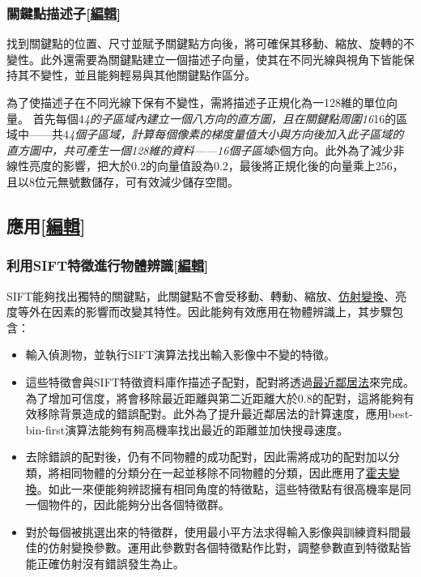 \documentclass[
]{article}
\begin{document}
\hypertarget{header-n65}{%
\subsubsection{\texorpdfstring{關鍵點描述子{[}\href{https://zh.wikipedia.org/w/index.php?title=尺度不變特徵轉換\&action=edit\&section=9}{編輯}{]}}{關鍵點描述子{[}編輯{]}}}\label{header-n65}}

找到關鍵點的位置、尺寸並賦予關鍵點方向後，將可確保其移動、縮放、旋轉的不變性。此外還需要為關鍵點建立一個描述子向量，使其在不同光線與視角下皆能保持其不變性，並且能夠輕易與其他關鍵點作區分。

為了使描述子在不同光線下保有不變性，需將描述子正規化為一128維的單位向量。
首先每個4\emph{4的子區域內建立一個八方向的直方圖，且在關鍵點周圍16}16的區域中------共4\emph{4個子區域，計算每個像素的梯度量值大小與方向後加入此子區域的直方圖中，共可產生一個128維的資料------16個子區域}8個方向。此外為了減少非線性亮度的影響，把大於0.2的向量值設為0.2，最後將正規化後的向量乘上256，且以8位元無號數儲存，可有效減少儲存空間。

\hypertarget{header-n68}{%
\subsection{\texorpdfstring{應用{[}\href{https://zh.wikipedia.org/w/index.php?title=尺度不變特徵轉換\&action=edit\&section=10}{編輯}{]}}{應用{[}編輯{]}}}\label{header-n68}}

\hypertarget{header-n69}{%
\subsubsection{\texorpdfstring{利用SIFT特徵進行物體辨識{[}\href{https://zh.wikipedia.org/w/index.php?title=尺度不變特徵轉換\&action=edit\&section=11}{編輯}{]}}{利用SIFT特徵進行物體辨識{[}編輯{]}}}\label{header-n69}}

SIFT能夠找出獨特的關鍵點，此關鍵點不會受移動、轉動、縮放、\href{https://zh.wikipedia.org/wiki/仿射变换}{仿射變換}、亮度等外在因素的影響而改變其特性。因此能夠有效應用在物體辨識上，其步驟包含：

\begin{itemize}
\item
  輸入偵測物，並執行SIFT演算法找出輸入影像中不變的特徵。
\item
  這些特徵會與SIFT特徵資料庫作描述子配對，配對將透過\href{https://zh.wikipedia.org/wiki/最近鄰居法}{最近鄰居法}來完成。為了增加可信度，將會移除最近距離與第二近距離大於0.8的配對，這將能夠有效移除背景造成的錯誤配對。此外為了提升最近鄰居法的計算速度，應用best-bin-first演算法能夠有夠高機率找出最近的距離並加快搜尋速度。
\item
  去除錯誤的配對後，仍有不同物體的成功配對，因此需將成功的配對加以分類，將相同物體的分類分在一起並移除不同物體的分類，因此應用了\href{https://zh.wikipedia.org/wiki/霍夫變換}{霍夫變換}。如此一來便能夠辨認擁有相同角度的特徵點，這些特徵點有很高機率是同一個物件的，因此能夠分出各個特徵群。
\item
  對於每個被挑選出來的特徵群，使用最小平方法求得輸入影像與訓練資料間最佳的仿射變換參數。運用此參數對各個特徵點作比對，調整參數直到特徵點皆能正確仿射沒有錯誤發生為止。
\end{itemize}
\end{document}
